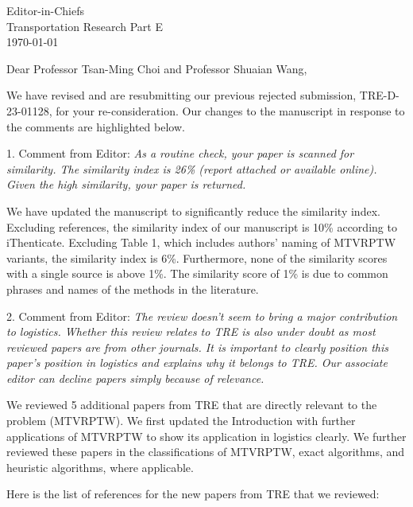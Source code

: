 \documentclass[11pt]{letter}
\begin{document}
\thispagestyle{empty}

\begin{flushleft}
   Editor-in-Chiefs\\
   Transportation Research Part E\\
   \vspace{1cm}
   \today
\end{flushleft}


Dear Professor Tsan-Ming Choi and Professor Shuaian Wang,

We have revised and are resubmitting our previous rejected submission, TRE-D-23-01128, for your re-consideration.  Our changes to the manuscript in response to the comments are highlighted below.

1. Comment from Editor: \textit{As a routine check, your paper is scanned for similarity. The similarity index is 26\% (report attached or available online). Given the high similarity, your paper is returned.}

We have updated the manuscript to significantly reduce the similarity index.  Excluding references, the similarity index of our manuscript is 10\% according to iThenticate.  Excluding Table 1, which includes authors' naming of MTVRPTW variants, the similarity index is 6\%.  Furthermore, none of the similarity scores with a single source is above 1\%.  The similarity score of 1\% is due to common phrases and names of the methods in the literature.

2. Comment from Editor: \textit{The review doesn't seem to bring a major contribution to logistics. Whether this review relates to TRE is also under doubt as most reviewed papers are from other journals. It is important to clearly position this paper's position in logistics and explains why it belongs to TRE. Our associate editor can decline papers simply because of relevance.}

We reviewed 5 additional papers from TRE that are directly relevant to the problem (MTVRPTW). We first updated the Introduction with further applications of MTVRPTW to show its application in logistics clearly. We further reviewed these papers in the classifications of MTVRPTW, exact algorithms, and heuristic algorithms, where applicable.

Here is the list of references for the new papers from TRE that we reviewed:
\end{document}
